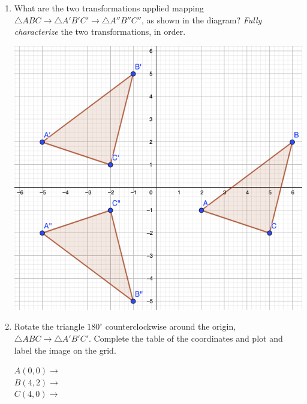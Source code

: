 \begin{enumerate}
\item What are the two transformations applied mapping $\triangle ABC \rightarrow \triangle A'B'C' \rightarrow \triangle A''B''C''$, as shown in the diagram? \emph{Fully characterize} the two transformations, in order.
    \begin{flushright}
      \includegraphics[width=6in]{../graphics/08Translate+reflect.png}
    \end{flushright}

\item Rotate the triangle $180^\circ$ counterclockwise around the origin, $\triangle ABC \rightarrow \triangle A'B'C'$. Complete the table of the coordinates and plot and label the image on the grid. \vspace{0.5cm}
\begin{multicols}{2}
  $A(0,0) \rightarrow$ \\[0.7cm]
  $B(4,2) \rightarrow$ \\[0.7cm]
  $C(4,0) \rightarrow$ \\[0.7cm]
  \end{multicols}
  

\end{enumerate}
